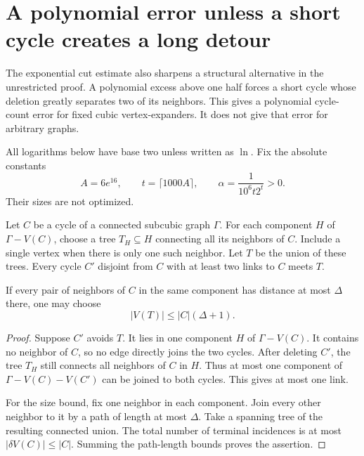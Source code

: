 \section{A polynomial error unless a short cycle creates a long detour}
\label{sec:second-order-detours}

The exponential cut estimate also sharpens a structural alternative in the unrestricted proof.
A polynomial excess above one half forces a short cycle whose deletion greatly separates two of its neighbors.
This gives a polynomial cycle-count error for fixed cubic vertex-expanders.
It does not give that error for arbitrary graphs.

All logarithms below have base two unless written as $\ln$.
Fix the absolute constants
\[
 A=6e^{16},\qquad t=\lceil1000A\rceil,
 \qquad \alpha=\frac1{10^6t2^t}>0.
\]
Their sizes are not optimized.

\begin{lemma}
\label{lem:multiple-link-terminal-forest}
Let $C$ be a cycle of a connected subcubic graph $\Gamma$.
For each component $H$ of $\Gamma-V(C)$, choose a tree $T_H\subseteq H$ connecting all its neighbors of $C$.
Include a single vertex when there is only one such neighbor.
Let $T$ be the union of these trees.
Every cycle $C'$ disjoint from $C$ with at least two links to $C$ meets $T$.

If every pair of neighbors of $C$ in the same component has distance at most $\Delta$ there, one may choose
\[
 |V(T)|\le |C|(\Delta+1).
\]
\end{lemma}

\begin{proof}
Suppose $C'$ avoids $T$.
It lies in one component $H$ of $\Gamma-V(C)$.
It contains no neighbor of $C$, so no edge directly joins the two cycles.
After deleting $C'$, the tree $T_H$ still connects all neighbors of $C$ in $H$.
Thus at most one component of $\Gamma-V(C)-V(C')$ can be joined to both cycles.
This gives at most one link.

For the size bound, fix one neighbor in each component.
Join every other neighbor to it by a path of length at most $\Delta$.
Take a spanning tree of the resulting connected union.
The total number of terminal incidences is at most $|\delta V(C)|\le|C|$.
Summing the path-length bounds proves the assertion.
\end{proof}

